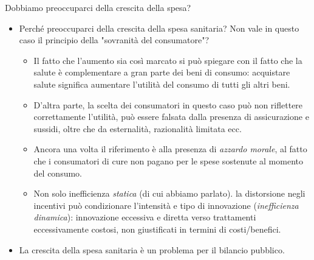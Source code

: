\documentclass[aspectratio=64,11pt]{beamer}
\begin{document}
\begin{frame}{Dobbiamo preoccuparci della crescita della spesa?}
\begin{itemize}
\item Perché preoccuparci della crescita della spesa sanitaria? Non vale in
questo caso il principio della "sovranità del consumatore"?
\begin{itemize}
\item Il fatto che l'aumento sia così marcato si può spiegare con il fatto che la
salute è complementare a gran parte dei beni di consumo: acquistare salute
significa aumentare l'utilità del consumo di tutti gli altri beni.
\item D'altra parte, la scelta dei consumatori in questo caso può non
riflettere correttamente l'utilità, può essere falsata dalla presenza di
assicurazione e sussidi, oltre che da esternalità, razionalità limitata
ecc.
\item Ancora una volta il riferimento è alla presenza di \emph{azzardo morale}, al
fatto che i consumatori di cure non pagano per le spese sostenute al
momento del consumo.
\item Non solo inefficienza \emph{statica} (di cui abbiamo parlato). la distorsione
negli incentivi può condizionare l'intensità e tipo di innovazione
(\emph{inefficienza dinamica}): innovazione eccessiva e diretta verso trattamenti
eccessivamente costosi, non giustificati in termini di costi/benefici.
\end{itemize}
\item La crescita della spesa sanitaria è un problema per il bilancio pubblico.
\end{itemize}
\end{frame}
\end{document}
